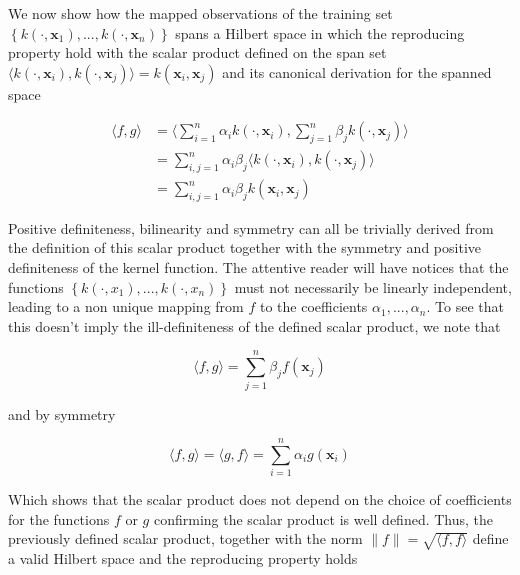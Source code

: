 We now show how the mapped observations of the training set $\left\{k\left(\cdot, \mathbf{x}_1\right), ..., k\left(\cdot, \mathbf{x}_n\right)\right\}$ spans a Hilbert space in which the reproducing property hold with the scalar product defined on the span set $\langle k\left(\cdot, \mathbf{x}_i\right), k\left(\cdot, \mathbf{x}_j\right)\rangle = k\left(\mathbf{x}_i, \mathbf{x}_j\right)$ and its canonical derivation for the spanned space

\begin{equation*}
  \begin{aligned}
    \langle f, g\rangle 
    &= \langle \sum_{i=1}^n\alpha_ik(\cdot, \mathbf{x}_i), \sum_{j=1}^n\beta_jk(\cdot, \mathbf{x}_j)\rangle \\
    &= \sum_{i,j=1}^n\alpha_i\beta_j \langle k\left(\cdot, \mathbf{x}_i\right), k\left(\cdot, \mathbf{x}_j\right)\rangle \\
    &= \sum_{i,j=1}^n\alpha_i\beta_j k\left(\mathbf{x}_i, \mathbf{x}_j\right)
  \end{aligned}
\end{equation*}

Positive definiteness, bilinearity and symmetry can all be trivially derived from the definition of this scalar product together with the symmetry and positive definiteness of the kernel function. The attentive reader will have notices that the functions $\left\{k\left(\cdot, x_1\right), ..., k\left(\cdot, x_n\right)\right\}$ must not necessarily be linearly independent, leading to a non unique mapping from $f$ to the coefficients $\alpha_1, ..., \alpha_n$. To see that this doesn't imply the ill-definiteness of the defined scalar product, we note that

\begin{equation*}
  \langle f, g\rangle = \sum_{j=1}^n\beta_j f\left(\mathbf{x}_j\right)
\end{equation*}

and by symmetry

\begin{equation*}
  \langle f, g\rangle = \langle g, f\rangle = \sum_{i=1}^n\alpha_i g\left(\mathbf{x}_i\right)
\end{equation*}

Which shows that the scalar product does not depend on the choice of coefficients for the functions $f$ or $g$ confirming the scalar product is well defined. Thus, the previously defined scalar product, together with the norm $\|f\| = \sqrt{\langle f, f\rangle }$ define a valid Hilbert space and the reproducing property holds

